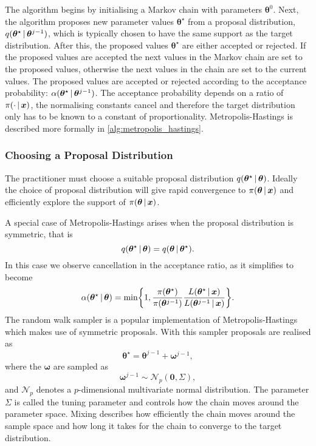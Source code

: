 The algorithm begins by initialising a Markov chain with parameters $\bm{\theta}^{0}$.
Next, the algorithm proposes new parameter values ${\bm{\theta}}^\star$ from a proposal
distribution, $q(\bm{\theta}^\star \,|\, {\bm{\theta}}^{j-1})$, which is typically chosen
to have the same support as the target distribution. After this, the proposed values
${\bm{\theta}}^\star$ are either accepted or rejected. If the proposed values are accepted
the next values in the Markov chain are set to the proposed values, otherwise the next
values in the chain are set to the current values. The proposed values are accepted or
rejected according to the acceptance probability: $\alpha({\bm{\theta}}^\star \,|\,
{\bm{\theta}^{j-1}})$.  The acceptance probability depends on a ratio of $\pi(\cdot \,|\,
\bm{x})$, the normalising constants cancel and therefore the target distribution only has
to be known to a constant of proportionality. Metropolis-Hastings is described more
formally in \cref{alg:metropolis_hastings}.

\subsubsection{Choosing a Proposal Distribution}
\label{ssec:proposal_distribution}

The practitioner must choose a suitable proposal distribution $q(\bm{\theta}^\star \,|\,
  \bm{\theta})$. Ideally the choice of proposal distribution will give rapid convergence to
$\pi(\bm{\theta} \,|\, \bm{x})$ and efficiently explore the support of $\pi(\bm{\theta}
  \,|\, \bm{x})$.

A special case of Metropolis-Hastings arises when the proposal distribution is symmetric,
that is
\begin{equation*}
  q(\bm{\theta}^\star \,|\, \bm{\theta}) = q(\bm{\theta} \,|\, \bm{\theta}^\star).
\end{equation*}
In this case we observe cancellation in the acceptance ratio, as it simplifies to become
\begin{equation*}
  \alpha({\bm{\theta}}^\star \,|\, \bm{\theta}) = \text{min}\bigg\{ 1,
  \frac{\pi({\bm{\theta}}^\star)}{\pi({\bm{\theta}}^{j-1})} \frac{L(\bm{\theta}^\star \,|\,
    \bm{x})}{L({\bm{\theta}}^{j-1} \,|\, \bm{x})} \bigg\}.
\end{equation*}
The random walk sampler is a popular implementation of Metropolis-Hastings which makes
use of symmetric proposals. With this sampler proposals are realised as
\begin{equation*}
  \bm{\theta}^\star = \bm{\theta}^{j-1} + \bm{\omega}^{j-1},
\end{equation*}
where the $\bm{\omega}$ are sampled as
\begin{equation*}
  \bm{\omega}^{j-1} \sim \mathcal{N}_p(\bm{0}, \Sigma),
\end{equation*}
and $\mathcal{N}_p$ denotes a $p$-dimensional multivariate normal distribution. The
parameter $\Sigma$ is called the tuning parameter and controls how the chain moves around
the parameter space. Mixing describes how efficiently the chain moves around the sample
space and how long it takes for the chain to converge to the target distribution.

